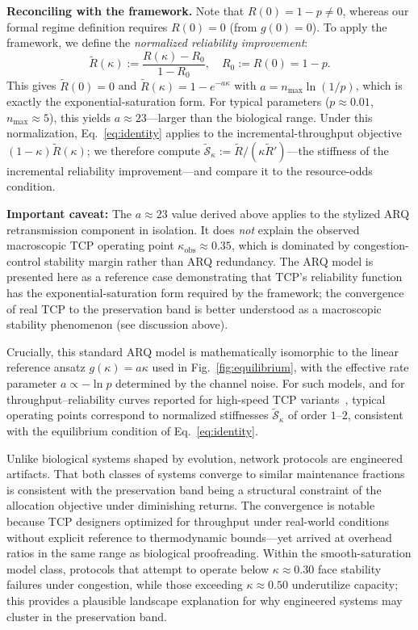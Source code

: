 \documentclass[11pt,twocolumn]{article}
\begin{document}
\textbf{Reconciling with the framework.} Note that $R(0) = 1 - p \neq 0$, whereas our formal regime definition requires $R(0) = 0$ (from $g(0) = 0$). To apply the framework, we define the \emph{normalized reliability improvement}:
\begin{equation}
\tilde{R}(\kappa) := \frac{R(\kappa) - R_0}{1 - R_0}, \quad R_0 := R(0) = 1 - p.
\end{equation}
This gives $\tilde{R}(0) = 0$ and $\tilde{R}(\kappa) = 1 - e^{-a\kappa}$ with $a = n_{\max} \ln(1/p)$, which is exactly the exponential-saturation form. For typical parameters ($p \approx 0.01$, $n_{\max} \approx 5$), this yields $a \approx 23$---larger than the biological range. Under this normalization, Eq.~\eqref{eq:identity} applies to the incremental-throughput objective $(1-\kappa)\tilde{R}(\kappa)$; we therefore compute $\tilde{\mathcal{S}}_\kappa := \tilde{R}/(\kappa \tilde{R}')$---the stiffness of the incremental reliability improvement---and compare it to the resource-odds condition.

\textbf{Important caveat:} The $a \approx 23$ value derived above applies to the stylized ARQ retransmission component in isolation. It does \emph{not} explain the observed macroscopic TCP operating point $\kappa_{\mathrm{obs}} \approx 0.35$, which is dominated by congestion-control stability margin rather than ARQ redundancy. The ARQ model is presented here as a reference case demonstrating that TCP's reliability function has the exponential-saturation form required by the framework; the convergence of real TCP to the preservation band is better understood as a macroscopic stability phenomenon (see discussion above).

Crucially, this standard ARQ model is mathematically isomorphic to the linear reference ansatz $g(\kappa) = a\kappa$ used in Fig.~\ref{fig:equilibrium}, with the effective rate parameter $a \propto -\ln p$ determined by the channel noise. For such models, and for throughput--reliability curves reported for high-speed TCP variants~\cite{Ha2008}, typical operating points correspond to normalized stiffnesses $\tilde{\mathcal{S}}_\kappa$ of order $1$--$2$, consistent with the equilibrium condition of Eq.~\eqref{eq:identity}.

Unlike biological systems shaped by evolution, network protocols are engineered artifacts. That both classes of systems converge to similar maintenance fractions is consistent with the preservation band being a structural constraint of the allocation objective under diminishing returns. The convergence is notable because TCP designers optimized for throughput under real-world conditions without explicit reference to thermodynamic bounds---yet arrived at overhead ratios in the same range as biological proofreading. Within the smooth-saturation model class, protocols that attempt to operate below $\kappa \approx 0.30$ face stability failures under congestion, while those exceeding $\kappa \approx 0.50$ underutilize capacity; this provides a plausible landscape explanation for why engineered systems may cluster in the preservation band.
\end{document}
